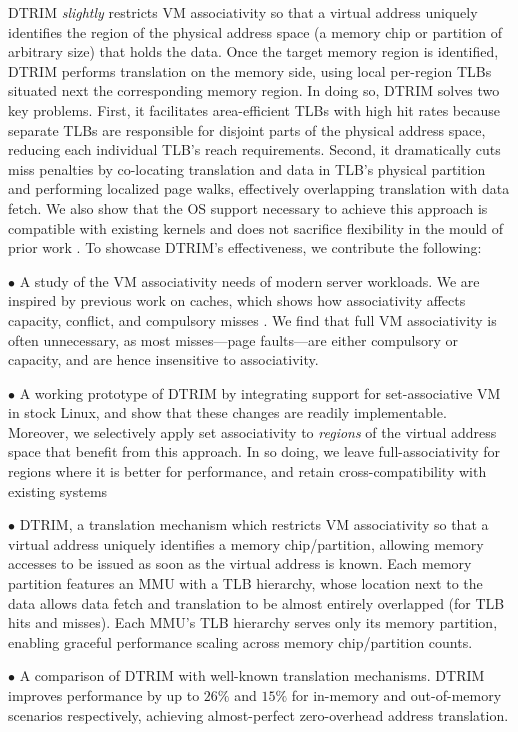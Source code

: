 DTRIM {\it slightly} restricts VM associativity so that a virtual
address uniquely identifies the region of the physical address space
(a memory chip or partition of arbitrary size) that holds the
data. Once the target memory region is identified, DTRIM performs
translation on the memory side, using local per-region TLBs situated
next the corresponding memory region. In doing so, DTRIM solves two
key problems. First, it facilitates area-efficient TLBs with high hit
rates because separate TLBs are responsible for disjoint parts of the
physical address space, reducing each individual TLB's reach
requirements. Second, it dramatically cuts miss penalties by
co-locating translation and data in TLB's physical partition and
performing localized page walks, effectively overlapping translation
with data fetch. We also show that the OS support necessary to achieve
this approach is compatible with existing kernels and does not
sacrifice flexibility in the mould of prior work \cite{basu:efficient,
  haria:devirtualizing}. To showcase DTRIM's effectiveness, we
contribute the following:

\noindent $\bullet$ A study of the VM associativity needs of modern
server workloads. We are inspired by previous work on caches, which
shows how associativity affects capacity, conflict, and compulsory
misses \cite{hill:case}. We find that full VM associativity is often
unnecessary, as most misses---page faults---are either compulsory or
capacity, and are hence insensitive to associativity. 

\noindent $\bullet$ A working prototype of DTRIM by integrating
support for set-associative VM in stock Linux, and show that these
changes are readily implementable. Moreover, we selectively apply set
associativity to {\it regions} of the virtual address space that
benefit from this approach. In so doing, we leave full-associativity
for regions where it is better for performance, and retain
cross-compatibility with existing systems

\noindent $\bullet$ DTRIM, a translation mechanism which restricts VM
associativity so that a virtual address uniquely identifies a memory
chip/partition, allowing memory accesses to be issued as soon as the
virtual address is known. Each memory partition features an MMU with a
TLB hierarchy, whose location next to the data allows data fetch and
translation to be almost entirely overlapped (for TLB hits and
misses). Each MMU's TLB hierarchy serves only its memory partition,
enabling graceful performance scaling across memory chip/partition
counts.

\noindent $\bullet$ A comparison of DTRIM with well-known translation
mechanisms. DTRIM improves performance by up to $26\%$ and $15\%$ for
in-memory and out-of-memory scenarios respectively, achieving
almost-perfect zero-overhead address translation.
